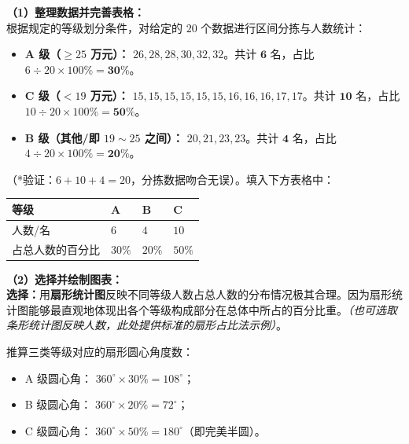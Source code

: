 \textbf{（1）整理数据并完善表格：} \\
根据规定的等级划分条件，对给定的 $20$ 个数据进行区间分拣与人数统计：
\begin{itemize}
  \item \textbf{A 级（$\geqslant 25$ 万元）：} $26, 28, 28, 30, 32, 32$。共计 $\boldsymbol{6}$ 名，占比 $6 \div 20 \times 100\% = \boldsymbol{30\%}$。
  \item \textbf{C 级（$< 19$ 万元）：} $15, 15, 15, 15, 15, 15, 16, 16, 16, 17, 17$。共计 $\boldsymbol{10}$ 名，占比 $10 \div 20 \times 100\% = \boldsymbol{50\%}$。
  \item \textbf{B 级（其他/即 $19 \sim 25$ 之间）：} $20, 21, 23, 23$。共计 $\boldsymbol{4}$ 名，占比 $4 \div 20 \times 100\% = \boldsymbol{20\%}$。
\end{itemize}

（*验证：$6+10+4=20$，分拣数据吻合无误）。填入下方表格中：

\vspace{0.2cm}
\begin{center}
\renewcommand{\arraystretch}{1.5}
\begin{tabular}{|>{\centering\arraybackslash}p{3.4cm}|>{\centering\arraybackslash}p{3.4cm}|>{\centering\arraybackslash}p{3.4cm}|>{\centering\arraybackslash}p{3.4cm}|}
  \hline
  \cellcolor{gray!15} 等级 & A & B & C \\
  \hline
  \cellcolor{gray!15} 人数/名 & \textbf{$6$} & \textbf{$4$} & \textbf{$10$} \\
  \hline
  \cellcolor{gray!15} 占总人数的百分比 & \textbf{$30\%$} & \textbf{$20\%$} & \textbf{$50\%$} \\
  \hline
\end{tabular}
\end{center}
\vspace{0.4cm}

\textbf{（2）选择并绘制图表：} \\
\textbf{选择：}用\textbf{扇形统计图}反映不同等级人数占总人数的分布情况极其合理。因为扇形统计图能够最直观地体现出各个等级构成部分在总体中所占的百分比重。\textit{（也可选取条形统计图反映人数，此处提供标准的扇形占比法示例）}。

推算三类等级对应的扇形圆心角度数：
\begin{itemize}
  \item A 级圆心角： $360^\circ \times 30\% = 108^\circ$；
  \item B 级圆心角： $360^\circ \times 20\% = 72^\circ$；
  \item C 级圆心角： $360^\circ \times 50\% = 180^\circ$（即完美半圆）。
\end{itemize}

